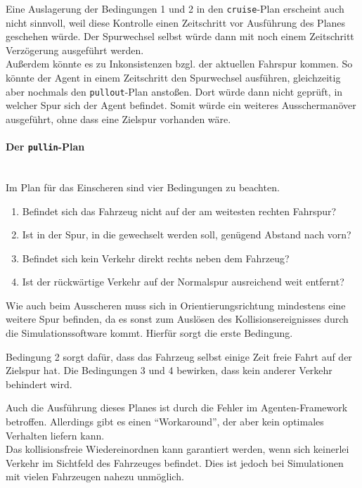 Eine Auslagerung der Bedingungen 1 und 2 in den \texttt{cruise}-Plan erscheint auch nicht sinnvoll, weil diese Kontrolle einen Zeitschritt vor Ausführung des Planes geschehen würde.
Der Spurwechsel selbst würde dann mit noch einem Zeitschritt Verzögerung ausgeführt werden.
\\
Außerdem könnte es zu Inkonsistenzen bzgl. der aktuellen Fahrspur kommen.
So könnte der Agent in einem Zeitschritt den Spurwechsel ausführen, gleichzeitig aber nochmals den \texttt{pullout}-Plan anstoßen.
Dort würde dann nicht geprüft, in welcher Spur sich der Agent befindet.
Somit würde ein weiteres Ausschermanöver ausgeführt, ohne dass eine Zielspur vorhanden wäre.


\paragraph*{Der \texttt{pullin}-Plan}
\hfill \\
Im Plan für das Einscheren sind vier Bedingungen zu beachten.

\begin{enumerate}
	\itemsep0em
	\item Befindet sich das Fahrzeug nicht auf der am weitesten rechten Fahrspur?
	\item Ist in der Spur, in die gewechselt werden soll, genügend Abstand nach vorn?
	\item Befindet sich kein Verkehr direkt rechts neben dem Fahrzeug?
	\item Ist der rückwärtige Verkehr auf der Normalspur ausreichend weit entfernt?
\end{enumerate}

Wie auch beim Ausscheren muss sich in Orientierungsrichtung mindestens eine weitere Spur befinden, da es sonst zum Auslösen des Kollisionsereignisses durch die Simulationssoftware kommt.
Hierfür sorgt die erste Bedingung.

Bedingung 2 sorgt dafür, dass das Fahrzeug selbst einige Zeit freie Fahrt auf der Zielspur hat.
Die Bedingungen 3 und 4 bewirken, dass kein anderer Verkehr behindert wird. 

Auch die Ausführung dieses Planes ist durch die Fehler im Agenten-Framework betroffen. Allerdings gibt es einen \enquote{Workaround}, der aber kein optimales Verhalten liefern kann.
\\
Das kollisionsfreie Wiedereinordnen kann garantiert werden, wenn sich keinerlei Verkehr im Sichtfeld des Fahrzeuges befindet.
Dies ist jedoch bei Simulationen mit vielen Fahrzeugen nahezu unmöglich.



